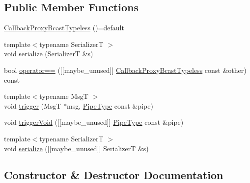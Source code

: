 \subsection*{Public Member Functions}
\begin{DoxyCompactItemize}
\item 
\hyperlink{structvt_1_1pipe_1_1callback_1_1_callback_proxy_bcast_typeless_aae02890f35c9e614419c2f08753e2b0c}{Callback\+Proxy\+Bcast\+Typeless} ()=default
\item 
{\footnotesize template$<$typename SerializerT $>$ }\\void \hyperlink{structvt_1_1pipe_1_1callback_1_1_callback_proxy_bcast_typeless_a8482d3a27030c2df06cc674012ec0ba7}{serialize} (SerializerT \&s)
\item 
bool \hyperlink{structvt_1_1pipe_1_1callback_1_1_callback_proxy_bcast_typeless_a9d77dd9c3bd0660e969402899ffeaacf}{operator==} (\mbox{[}\mbox{[}maybe\+\_\+unused\mbox{]}\mbox{]} \hyperlink{structvt_1_1pipe_1_1callback_1_1_callback_proxy_bcast_typeless}{Callback\+Proxy\+Bcast\+Typeless} const \&other) const
\item 
{\footnotesize template$<$typename MsgT $>$ }\\void \hyperlink{structvt_1_1pipe_1_1callback_1_1_callback_proxy_bcast_typeless_a43184b90b1bf96dbb6f912603fe08e37}{trigger} (MsgT $\ast$msg, \hyperlink{namespacevt_ac9852acda74d1896f48f406cd72c7bd3}{Pipe\+Type} const \&pipe)
\item 
void \hyperlink{structvt_1_1pipe_1_1callback_1_1_callback_proxy_bcast_typeless_a9abac331854a8e62ba596d14ce920b9e}{trigger\+Void} (\mbox{[}\mbox{[}maybe\+\_\+unused\mbox{]}\mbox{]} \hyperlink{namespacevt_ac9852acda74d1896f48f406cd72c7bd3}{Pipe\+Type} const \&pipe)
\item 
{\footnotesize template$<$typename SerializerT $>$ }\\void \hyperlink{structvt_1_1pipe_1_1callback_1_1_callback_proxy_bcast_typeless_ae17972192cd0437bf510544cbe5ee134}{serialize} (\mbox{[}\mbox{[}maybe\+\_\+unused\mbox{]}\mbox{]} SerializerT \&s)
\end{DoxyCompactItemize}


\subsection{Constructor \& Destructor Documentation}
\mbox{\label{structvt_1_1pipe_1_1callback_1_1_callback_proxy_bcast_typeless_aae02890f35c9e614419c2f08753e2b0c}} 
